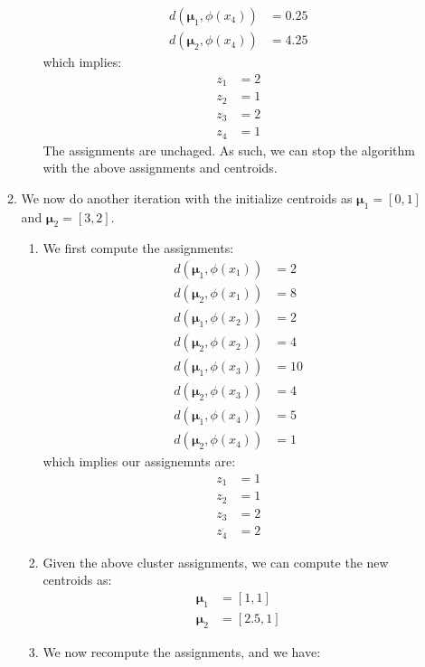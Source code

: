 \documentclass[12pt]{article}
\begin{document}
\begin{enumerate}[label=(\alph*)]
\begin{enumerate}
\begin{enumerate}[label=(\arabic*)]
\begin{align*}
        d(\bm{\mu}_1, \phi(x_4)) &= 0.25 \\
        d(\bm{\mu}_2, \phi(x_4)) &= 4.25
      \end{align*}
      which implies:
      \begin{align*}
        z_1 &= 2 \\
        z_2 &= 1 \\
        z_3 &= 2 \\
        z_4 &= 1
      \end{align*}
      The assignments are unchaged. As such, we can stop the algorithm with the above assignments and centroids.
    \end{enumerate}
    \item We now do another iteration with the initialize centroids as $\bm{\mu}_1 = [0,1]$ and $\bm{\mu}_2 = [3,2]$.
    \begin{enumerate}
      \item We first compute the assignments:
        \begin{align*}
          d(\bm{\mu}_1, \phi(x_1)) &= 2 \\
          d(\bm{\mu}_2, \phi(x_1)) &= 8 \\
          d(\bm{\mu}_1, \phi(x_2)) &= 2 \\
          d(\bm{\mu}_2, \phi(x_2)) &= 4 \\
          d(\bm{\mu}_1, \phi(x_3)) &= 10 \\
          d(\bm{\mu}_2, \phi(x_3)) &= 4 \\
          d(\bm{\mu}_1, \phi(x_4)) &= 5 \\
          d(\bm{\mu}_2, \phi(x_4)) &= 1
        \end{align*}
        which implies our assignemnts are:
        \begin{align*}
          z_1 &= 1 \\
          z_2 &= 1 \\
          z_3 &= 2 \\
          z_4 &= 2
        \end{align*}
      \item Given the above cluster assignments, we can compute the new centroids as:
        \begin{align*}
          \bm{\mu}_1 &= [1, 1] \\
          \bm{\mu}_2 &= [2.5, 1]
        \end{align*}
      \item We now recompute the assignments, and we have:
        \begin{align*}

\end{align*}
\end{enumerate}
\end{enumerate}
\end{enumerate}
\end{document}
